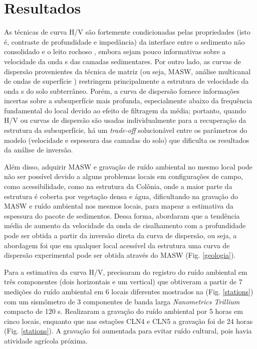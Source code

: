 \documentclass[smallextended]{svjour3}       %
\begin{document}

\section{Resultados}
\label{results}

As técnicas de curva H/V são fortemente condicionadas pelas propriedades (isto é, contraste de profundidade e impedância) da interface entre o sedimento não consolidado e o leito rochoso \citep{parolai2005joint}, embora sejam pouco informativas sobre a velocidade da onda s das camadas sedimentares. Por outro lado, as curvas de dispersão provenientes da técnica de matriz (ou seja, MASW, análise multicanal de ondas de superfície \citealp{park1999multichannel}) restringem principalmente a estrutura de velocidade da onda s do solo subterrâneo. Porém, a curva de dispersão fornece informações incertas sobre a subsuperfície mais profunda, especialmente abaixo da frequência fundamental do local devido ao efeito de filtragem da média; portanto, quando H/V ou curvas de dispersão são usadas individualmente para a recuperação da estrutura da subsuperfície, há um \textit{trade-off} solucionável entre os parâmetros do modelo (velocidade e espessura das camadas do solo) que dificulta os resultados da análise de inversão.

Além disso, adquirir MASW e gravação de ruído ambiental no mesmo local pode não ser possível devido a alguns problemas locais em configurações de campo, como acessibilidade, como na estrutura da Colônia, onde a maior parte da estrutura é coberta por vegetação densa e água, dificultando na gravação do MASW e ruído ambiental nos mesmos locais, para mapear a estimativa da espessura do pacote de sedimentos. Dessa forma, abordaram que a tendência média de aumento da velocidade da onda de cisalhamento com a profundidade pode ser obtida a partir da inversão direta da curva de dispersão, ou seja, a abordagem foi que em qualquer local acessível da estrutura uma curva de dispersão experimental pode ser obtida através do MASW (Fig. \ref{geologia}). 

Para a estimativa da curva H/V, precisaram do registro do ruído ambiental em três componentes (dois horizontais e um vertical) que obtiveram a partir de 7 medições do ruído ambiental em 6 locais diferentes mostrados na (Fig. \ref{stations}) com um sismômetro de 3 componentes de banda larga \textit{Nanometrics Trillium} compacto de 120 s. Realizaram a gravação do ruído ambiental por 5 horas em cinco locais, enquanto que nas estações CLN4 e CLN5 a gravação foi de 24 horas (Fig. \ref{stations}). A gravação foi aumentada para evitar ruído cultural, pois havia atividade agrícola próxima.
\end{document}
